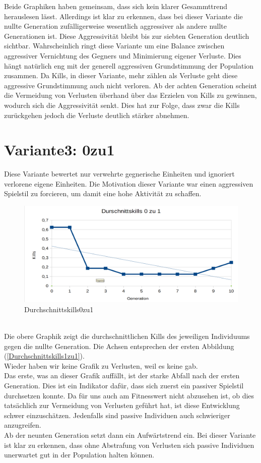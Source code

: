 \documentclass[
	12pt,
	a4paper,
	BCOR10mm,
	DIV14,
	headsepline,
	usegeometry,
]{scrreprt}
\begin{document}
Beide Graphiken haben gemeinsam, dass sich kein klarer Gesammttrend herauslesen lässt. Allerdings ist klar zu erkennen, dass bei dieser Variante die nullte Generation zufälligerweise wesentlich aggressiver als andere nullte Generationen ist. Diese Aggressivität bleibt bis zur siebten Generation deutlich sichtbar. Wahrscheinlich ringt diese Variante um eine Balance zwischen aggressiver Vernichtung des Gegners und Minimierung eigener Verluste. Dies hängt natürlich eng mit der generell aggressiven Grundstimmung der Population zusammen. Da Kills, in dieser Variante, mehr zählen als Verluste geht diese aggressive Grundstimmung auch nicht verloren. Ab der achten Generation scheint die Vermeidung von Verlusten überhand über das Erzielen von Kills zu gewinnen, wodurch sich die Aggressivität senkt. Dies hat zur Folge, dass zwar die Kills zurückgehen jedoch die Verluste deutlich stärker abnehmen.

\section{Variante3: 0zu1}
Diese Variante bewertet nur verwehrte gegnerische Einheiten und ignoriert verlorene eigene Einheiten. Die Motivation dieser Variante war einen aggressiven Spielstil zu forcieren, um damit eine hohe Aktivität zu schaffen.
\begin{figure}[h]
	\includegraphics[width = \textwidth]{Durchschnittskills0zu1.png}
	\caption{Durchschnittskills0zu1}
	\label{Durchschnittskills0zu1}
\end{figure}\\
Die obere Graphik zeigt die durchschnittlichen Kills des jeweiligen Individuums gegen die nullte Generation. Die Achsen entsprechen der ersten Abbildung (\ref{Durchschnittskills1zu1}).\\
Wieder haben wir keine Grafik zu Verlusten, weil es keine gab.\\
Das erste, was an dieser Grafik auffällt, ist der starke Abfall nach der ersten Generation. Dies ist ein Indikator dafür, dass sich zuerst ein passiver Spielstil durchsetzen konnte. Da für uns auch am Fitnesswert nicht abzusehen ist, ob dies tatsächlich zur Vermeidung von Verlusten geführt hat, ist diese Entwicklung schwer einzuschätzen. Jedenfalls sind passive Individuen auch schwieriger anzugreifen.\\
Ab der neunten Generation setzt dann ein Aufwärtstrend ein. Bei dieser Variante ist klar zu erkennen, dass ohne Abstrafung von Verlusten sich passive Individuen unerwartet gut in der Population halten können.
\end{document}
